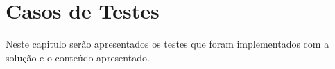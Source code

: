 \newpage
\chapter{Casos de Testes}
Neste capitulo serão apresentados os testes que foram implementados com a solução e o conteúdo apresentado.




